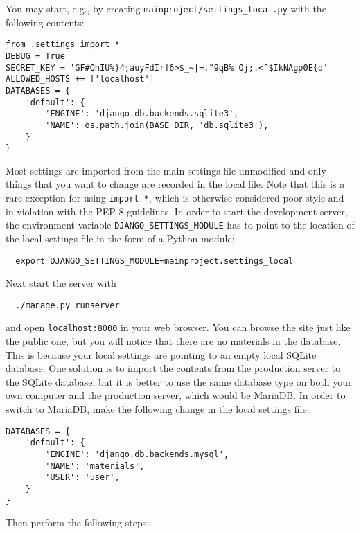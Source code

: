 \documentclass{article}
\begin{document}
You may start, e.g., by creating \verb+mainproject/settings_local.py+ with the following contents:
\lstset{language=Python}
\begin{lstlisting}
from .settings import *
DEBUG = True
SECRET_KEY = 'GF#QhIU%}4;auyFdIr]6>$_~|=."9qB%[Oj;.<^$IkNAgp0E{d'
ALLOWED_HOSTS += ['localhost']
DATABASES = {
    'default': {
        'ENGINE': 'django.db.backends.sqlite3',
        'NAME': os.path.join(BASE_DIR, 'db.sqlite3'),
    }
}
\end{lstlisting}
Most settings are imported from the main settings file unmodified and only things that you want to change are recorded in the local file. Note that this is a rare exception for using \verb+import *+, which is otherwise considered poor style and in violation with the PEP 8 guidelines. In order to start the development server, the environment variable \verb+DJANGO_SETTINGS_MODULE+ has to point to the location of the local settings file in the form of a Python module:
\lstset{language=Bash}
\begin{lstlisting}
  export DJANGO_SETTINGS_MODULE=mainproject.settings_local
\end{lstlisting}
Next start the server with
\begin{lstlisting}
  ./manage.py runserver
\end{lstlisting}
and open \verb+localhost:8000+ in your web browser. You can browse the site just like the public one, but you will notice that there are no materials in the database. This is because your local settings are pointing to an empty local SQLite database. One solution is to import the contents from the production server to the SQLite database, but it is better to use the same database type on both your own computer and the production server, which would be MariaDB. In order to switch to MariaDB, make the following change in the local settings file:
\lstset{language=Python}
\begin{lstlisting}
DATABASES = {
    'default': {
        'ENGINE': 'django.db.backends.mysql',
        'NAME': 'materials',
        'USER': 'user',
    }
}
\end{lstlisting}
Then perform the following steps:
\end{document}
